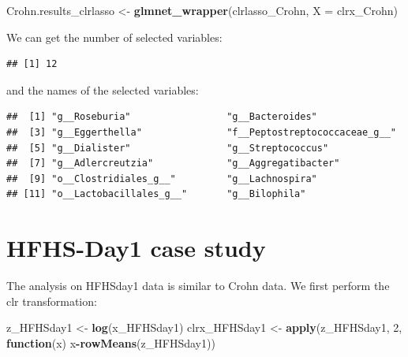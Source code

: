 \documentclass[openany]{book}
\newenvironment{Shaded}{\begin{snugshade}}{\end{snugshade}}
\newcommand{\KeywordTok}[1]{\textcolor[rgb]{0.13,0.29,0.53}{\textbf{#1}}}
\newcommand{\DataTypeTok}[1]{\textcolor[rgb]{0.13,0.29,0.53}{#1}}
\newcommand{\DecValTok}[1]{\textcolor[rgb]{0.00,0.00,0.81}{#1}}
\newcommand{\StringTok}[1]{\textcolor[rgb]{0.31,0.60,0.02}{#1}}
\newcommand{\ControlFlowTok}[1]{\textcolor[rgb]{0.13,0.29,0.53}{\textbf{#1}}}
\newcommand{\OperatorTok}[1]{\textcolor[rgb]{0.81,0.36,0.00}{\textbf{#1}}}
\newcommand{\NormalTok}[1]{#1}
\begin{document}
\begin{Shaded}
\begin{Highlighting}[]
\NormalTok{Crohn.results_clrlasso <-}\StringTok{ }\KeywordTok{glmnet_wrapper}\NormalTok{(clrlasso_Crohn, }\DataTypeTok{X =}\NormalTok{ clrx_Crohn)}
\end{Highlighting}
\end{Shaded}

We can get the number of selected variables:

\begin{Shaded}
\end{Shaded}

\begin{verbatim}
## [1] 12
\end{verbatim}

and the names of the selected variables:

\begin{Shaded}
\end{Shaded}

\begin{verbatim}
##  [1] "g__Roseburia"                 "g__Bacteroides"              
##  [3] "g__Eggerthella"               "f__Peptostreptococcaceae_g__"
##  [5] "g__Dialister"                 "g__Streptococcus"            
##  [7] "g__Adlercreutzia"             "g__Aggregatibacter"          
##  [9] "o__Clostridiales_g__"         "g__Lachnospira"              
## [11] "o__Lactobacillales_g__"       "g__Bilophila"
\end{verbatim}

\section{HFHS-Day1 case study}\label{hfhs-day1-case-study-1}

The analysis on HFHSday1 data is similar to Crohn data. We first perform
the clr transformation:

\begin{Shaded}
\begin{Highlighting}[]
\NormalTok{z_HFHSday1 <-}\StringTok{ }\KeywordTok{log}\NormalTok{(x_HFHSday1)}
\NormalTok{clrx_HFHSday1 <-}\StringTok{ }\KeywordTok{apply}\NormalTok{(z_HFHSday1, }\DecValTok{2}\NormalTok{, }\ControlFlowTok{function}\NormalTok{(x) x}\OperatorTok{-}\KeywordTok{rowMeans}\NormalTok{(z_HFHSday1))}
\end{Highlighting}
\end{Shaded}
\end{document}
